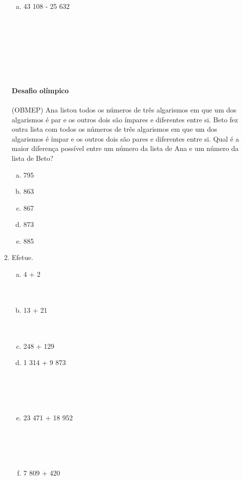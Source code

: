 \documentclass[a4paper,14pt]{article}
\begin{document}
\begin{multicols}{2}
\begin{enumerate}
\begin{enumerate}[a)]
				\item 43 108 - 25 632 \\\\\\\\\\\\\\\\
			\end{enumerate}
			\textbf{Desafio olímpico} \\\\
			(OBMEP) Ana listou todos os números de três algarismos em que um dos algarismos é par e os outros dois são ímpares e diferentes entre si. Beto fez outra lista com todos os números de três algarismos em que um dos algarismos é ímpar e os outros dois são pares e diferentes entre si. Qual é a maior diferença possível entre um número da lista de Ana e um número da lista de Beto?
			\begin{enumerate}[a)]
				\item 795
				\item 863
				\item 867
				\item 873
				\item 885
			\end{enumerate}
			\item Efetue.
			\begin{enumerate}[a)]
				\item 4 + 2 \\\\\\
				\item 13 + 21 \\\\\\
				\item 248 + 129 \newpage
				\item 1 314 + 9 873 \\\\\\\\\\
				\item 23 471 + 18 952 \\\\\\\\\\
				\item 7 809 + 420 \\\\\\\\\\

\end{enumerate}
\end{enumerate}
\end{multicols}
\end{document}
